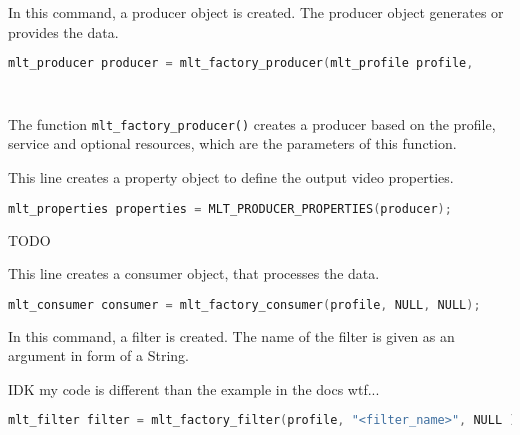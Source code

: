\documentclass[../MasterThesis.tex]{subfiles}
\begin{document}
\begin{description}[font=\normalfont\color{RedViolet!80!black}, style=nextline]
	In this command, a producer object is created. The producer object generates or provides the data.

	\begin{lstlisting}[language=C, numbers=none, basicstyle=\scriptsize\ttfamily, belowskip=0pt, aboveskip=9pt]
	mlt_producer producer = mlt_factory_producer(mlt_profile profile,
																							  const char* service,
																							  const void* resource); \end{lstlisting}
																						  
	The function \texttt{mlt\_factory\_producer()} creates a producer based on the profile, service and optional resources, which are the parameters of this function.


	
	
	\item[Create properties] 
	
	This line creates a property object to define the output video properties.
	
	\begin{lstlisting}[language=C, numbers=none, basicstyle=\scriptsize\ttfamily, belowskip=0pt, aboveskip=9pt]
	mlt_properties properties = MLT_PRODUCER_PROPERTIES(producer); \end{lstlisting}
	
	
	\item[Create a consumer] TODO
	
	This line creates a consumer object, that processes the data.
	
	\begin{lstlisting}[language=C, numbers=none, basicstyle=\scriptsize\ttfamily, belowskip=0pt, aboveskip=9pt]
	mlt_consumer consumer = mlt_factory_consumer(profile, NULL, NULL); \end{lstlisting}
	
	

	
	
	
	\item[Create a filter] 
	
	In this command, a filter is created. The name of the filter is given as an argument in form of a String.
	
	IDK my code is different than the example in the docs wtf...
	
	\begin{lstlisting}[language=C, numbers=none, basicstyle=\scriptsize\ttfamily, belowskip=0pt, aboveskip=9pt]
	mlt_filter filter = mlt_factory_filter(profile, "<filter_name>", NULL ); \end{lstlisting}




\end{description}
\end{document}
